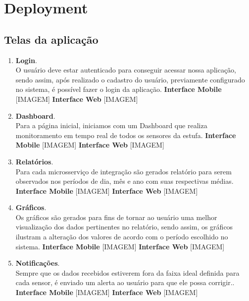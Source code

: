 \section{Deployment}

\subsection{Telas da aplicação}

\begin{enumerate}
	\item \textbf{Login}. \\ O usuário deve estar autenticado para conseguir acessar nossa aplicação, sendo assim, após realizado o cadastro do usuário, previamente configurado no sistema, é possível fazer o login da aplicação.
	\subitem \textbf{Interface Mobile}
	[IMAGEM]
	\subitem \textbf{Interface Web}
	[IMAGEM]
	
	\item \textbf{Dashboard}. \\ Para a página inicial, iniciamos com um Dashboard que realiza monitoramento em tempo real de todos os sensores da estufa.
	\subitem \textbf{Interface Mobile}
	[IMAGEM]
	\subitem \textbf{Interface Web}
	[IMAGEM]
	
	\item \textbf{Relatórios}. \\ Para cada microsserviço de integração são gerados relatório para serem observados nos períodos de dia, mês e ano com suas respectivas médias.
	\subitem \textbf{Interface Mobile}
	[IMAGEM]
	\subitem \textbf{Interface Web}
	[IMAGEM]
	
	\item \textbf{Gráficos}. \\ Os gráficos são gerados para fins de tornar ao usuário uma melhor visualização dos dados pertinentes no relatório, sendo assim, os gráficos ilustram a alteração dos valores de acordo com o período escolhido no sistema.
	\subitem \textbf{Interface Mobile}
	[IMAGEM]
	\subitem \textbf{Interface Web}
	[IMAGEM]
	
	\item \textbf{Notificações}. \\ Sempre que os dados recebidos estiverem fora da faixa ideal definida para cada sensor, é enviado um alerta ao usuário para que ele possa corrigir..
	\subitem \textbf{Interface Mobile}
	[IMAGEM]
	\subitem \textbf{Interface Web}
	[IMAGEM]
	
\end{enumerate}

